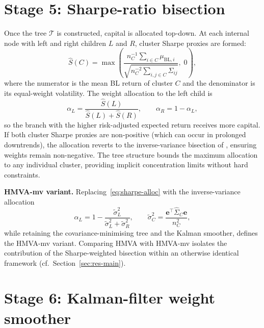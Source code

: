 \documentclass[a4paper,12pt]{report}
\begin{document}
\section{Stage 5: Sharpe-ratio bisection}
\label{sec:meth-bisect}

Once the tree $\mathcal{T}$ is constructed, capital is allocated top-down.
At each internal node with left and right children $L$ and $R$, cluster
Sharpe proxies are formed:
\begin{equation}
  \hat{S}(C) = \max\!\left(
    \frac{n_C^{-1}\sum_{i \in C}\mu_{\mathrm{BL},i}}
         {\sqrt{n_C^{-2}\sum_{i,j \in C}\hat{\Sigma}_{ij}}},\; 0
  \right),
  \label{eq:sharpe-proxy}
\end{equation}
where the numerator is the mean BL return of cluster $C$ and the denominator
is its equal-weight volatility. The weight allocation to the left child is
\begin{equation}
  \alpha_L = \frac{\hat{S}(L)}{\hat{S}(L)+\hat{S}(R)}, \qquad \alpha_R = 1-\alpha_L,
  \label{eq:sharpe-alloc}
\end{equation}
so the branch with the higher risk-adjusted expected return receives more
capital. If both cluster Sharpe proxies are non-positive (which can occur
in prolonged downtrends), the allocation reverts to the inverse-variance
bisection of \citet{lopezdeprado2016}, ensuring weights remain non-negative.
The tree structure bounds the maximum allocation to any individual cluster,
providing implicit concentration limits without hard constraints.

\textbf{HMVA-mv variant.} Replacing~\eqref{eq:sharpe-alloc} with the
inverse-variance allocation
\begin{equation}
  \alpha_L = 1 - \frac{\tilde{\sigma}_L^2}{\tilde{\sigma}_L^2 + \tilde{\sigma}_R^2},
  \qquad
  \tilde{\sigma}_C^2 = \frac{\mathbf{e}^{\top}\hat{\Sigma}_C\mathbf{e}}{n_C^2},
  \label{eq:var-bisect}
\end{equation}
while retaining the covariance-minimising tree and the Kalman smoother,
defines the HMVA-mv variant. Comparing HMVA with HMVA-mv isolates the
contribution of the Sharpe-weighted bisection within an otherwise identical
framework (cf.\ Section~\ref{sec:res-main}).

\section{Stage 6: Kalman-filter weight smoother}
\label{sec:meth-kf}
\end{document}

